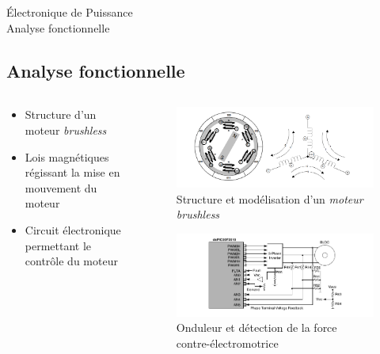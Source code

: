 \documentclass{beamer}
\begin{document}
	\begin{frame}{Électronique de Puissance\\ Analyse fonctionnelle}
		\subsection[Analyse F]{Analyse fonctionnelle}
		\begin{columns}[T]
	  		\begin{column}{0.4\textwidth}
				\begin{itemize}
					\item Structure d'un moteur \textit{brushless}
					\item Lois magnétiques régissant la mise en mouvement du moteur
					\item Circuit électronique permettant le contrôle du moteur
				\end{itemize}
	  		\end{column}
	  		\begin{column}{0.6\textwidth}
	  			\vspace{-1em}
	  			\begin{figure}
	  				\begin{center}
	  					\includegraphics[height=0.3\textheight]{../Illus/struct_bldcm.png}
	  				\end{center}
	    			\caption{Structure et modélisation d'un \textit{moteur brushless}}
	    		\end{figure}
	    		\vspace{-2em}
	  			\begin{figure}
	  				\begin{center}
	  					\includegraphics[height=0.3\textheight]{../Illus/back_emf_scheme.png}
	  				\end{center}
	    			\caption{Onduleur et détection de la force contre-électromotrice}
	    		\end{figure}
	  		\end{column}
		\end{columns}

	\end{frame}	
		
\end{document}
